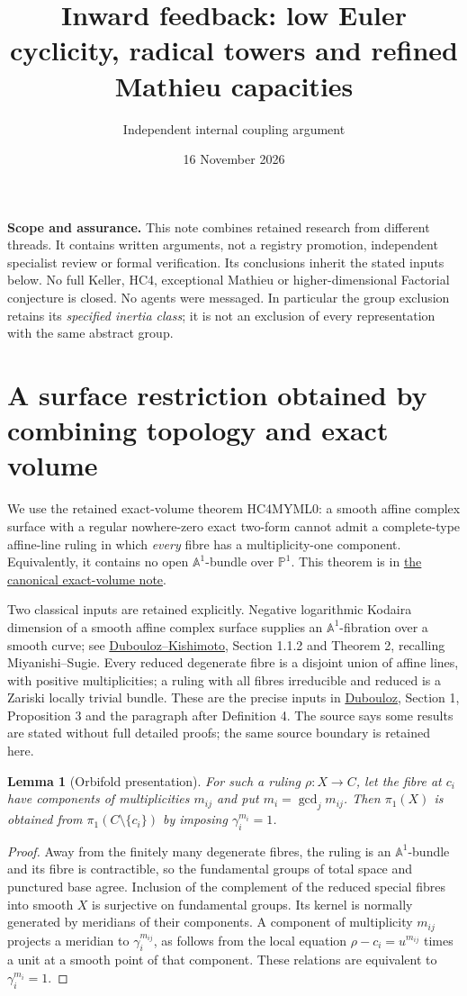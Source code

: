 \documentclass[11pt]{article}
\title{Inward feedback: low Euler cyclicity, radical towers and refined Mathieu capacities}
\author{Independent internal coupling argument}
\date{16 November 2026}
\newtheorem{lemma}[theorem]{Lemma}
\newcommand{\A}{\mathbb A}
\begin{document}
\maketitle
\noindent\textbf{Scope and assurance.}
This note combines retained research from different threads. It contains
written arguments, not a registry promotion, independent specialist review
or formal verification. Its conclusions inherit the stated inputs below.
No full Keller, HC4, exceptional Mathieu or higher-dimensional Factorial
conjecture is closed. No agents were messaged. In particular the group
exclusion retains its \emph{specified inertia class}; it is not an
exclusion of every representation with the same abstract group.

\section{A surface restriction obtained by combining topology and exact volume}

We use the retained exact-volume theorem HC4MYML0: a smooth affine complex
surface with a regular nowhere-zero exact two-form cannot admit a
complete-type affine-line ruling in which \emph{every} fibre has a
multiplicity-one component. Equivalently, it contains no open
$\A^1$-bundle over $\mathbb P^1$. This theorem is in
\href{../hc4-triangular-graphs/EXACT_VOLUME_AND_COMPLETE_RULING_COMPONENTS.md}{the canonical exact-volume note}.

Two classical inputs are retained explicitly. Negative logarithmic Kodaira
dimension of a smooth affine complex surface supplies an $\A^1$-fibration
over a smooth curve; see
\href{https://arxiv.org/abs/1408.1328}{Dubouloz--Kishimoto}, Section 1.1.2
and Theorem 2, recalling Miyanishi--Sugie.
Every reduced degenerate fibre is a disjoint union of affine lines,
with positive multiplicities; a ruling with all fibres irreducible and
reduced is a Zariski locally trivial bundle. These are the precise inputs
in
\href{https://arxiv.org/html/2002.12838v1}{Dubouloz}, Section 1,
Proposition 3 and the paragraph after Definition 4.
The source says some results are stated without full detailed proofs;
the same source boundary is retained here.

\begin{lemma}[Orbifold presentation]
For such a ruling $\rho:X\to C$, let the fibre at $c_i$ have components
of multiplicities $m_{ij}$ and put $m_i=\gcd_jm_{ij}$. Then $\pi_1(X)$
is obtained from $\pi_1(C\setminus\{c_i\})$ by imposing
$\gamma_i^{m_i}=1$.
\end{lemma}
\begin{proof}
Away from the finitely many degenerate fibres, the ruling is an
$\A^1$-bundle and its fibre is contractible, so the fundamental groups
of total space and punctured base agree. Inclusion of the complement
of the reduced special fibres into smooth $X$ is surjective on
fundamental groups. Its kernel is normally generated by meridians of
their components. A component of multiplicity $m_{ij}$ projects a
meridian to $\gamma_i^{m_{ij}}$, as follows from the local equation
$\rho-c_i=u^{m_{ij}}$ times a unit at a smooth point of that component.
These relations are equivalent to $\gamma_i^{m_i}=1$.
\end{proof}
\end{document}

